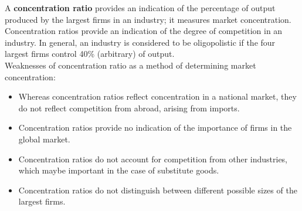 \documentclass[a4paper,12pt]{article}
\newcommand{\needbold}[1]{\textcolor{red!70!black}{\textbf{#1}}}
\begin{document}
A \needbold{concentration ratio} provides an indication of the percentage of output produced by the largest firms in an industry; it measures market concentration.
Concentration ratios provide an indication of the degree of competition in an industry. In general, an industry is considered to be oligopolistic if the four largest firms control 40\% (arbitrary) of output.\\
Weaknesses of concentration ratio as a method of determining market concentration:
\begin{itemize}
  \item Whereas concentration ratios reflect concentration in a national market, they do not reflect competition from abroad, arising from imports.
  \item Concentration ratios provide no indication of the importance of firms in the global market.
  \item Concentration ratios do not account for competition from other industries, which maybe important in the case of substitute goods.
  \item Concentration ratios do not distinguish between different possible sizes of the largest firms.
\end{itemize}
\end{document}
